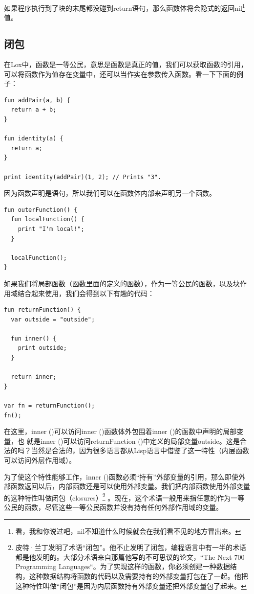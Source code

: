 \documentclass[cn,10pt,math=newtx,citestyle=gb7714-2015,bibstyle=gb7714-2015]{elegantbook}
\begin{document}
如果程序执行到了块的末尾都没碰到return语句，那么函数体将会隐式的返回nil\footnote{看，我和你说过吧，nil不知道什么时候就会在我们看不见的地方冒出来。} 值。

\subsection{闭包}

在Lox中，函数是一等公民，意思是函数是真正的值，我们可以获取函数的引用，可以将函数作为值存在变量中，还可以当作实在参数传入函数。看一下下面的例子：

\begin{verbatim}
fun addPair(a, b) {
  return a + b;
}

fun identity(a) {
  return a;
}

print identity(addPair)(1, 2); // Prints "3".
\end{verbatim}

因为函数声明是语句，所以我们可以在函数体内部来声明另一个函数。

\begin{verbatim}
fun outerFunction() {
  fun localFunction() {
    print "I'm local!";
  }

  localFunction();
}
\end{verbatim}

如果我们将局部函数（函数里面的定义的函数），作为一等公民的函数，以及块作用域结合起来使用，我们会得到以下有趣的代码：

\begin{verbatim}
fun returnFunction() {
  var outside = "outside";

  fun inner() {
    print outside;
  }

  return inner;
}

var fn = returnFunction();
fn();
\end{verbatim}

在这里，inner ()可以访问inner ()函数体外包围着inner ()的函数中声明的局部变量，也
就是inner ()可以访问returnFunction ()中定义的局部变量outside。这是合法的吗？当然是合法的，因为很多语言都从Lisp语言中借鉴了这一特性（内层函数可以访问外层作用域）。

为了使这个特性能够工作，inner ()函数必须“持有”外部变量的引用，那么即使外部函数返回以后，内部函数还是可以使用外部变量。我们把内部函数使用外部变量的这种特性叫做闭包（closures）\footnote{皮特·兰丁发明了术语“闭包”。他不止发明了闭包，编程语言中有一半的术语都是他发明的。大部分术语来自那篇他写的不可思议的论文，“The Next 700 Programming Languages“。为了实现这样的函数，你必须创建一种数据结构，这种数据结构将函数的代码以及需要持有的外部变量打包在了一起。他把这种特性叫做“闭包”是因为内层函数持有外部变量还把外部变量包了起来。} 。现在，这个术语一般用来指任意的作为一等公民的函数，尽管这些一等公民函数并没有持有任何外部作用域的变量。
\end{document}
